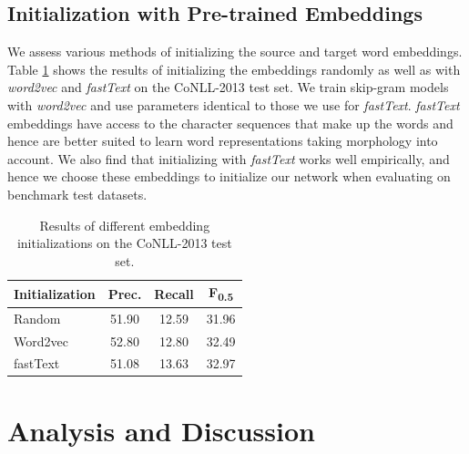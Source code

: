 \documentclass[letterpaper]{article}
\begin{document}
\subsection{Initialization with Pre-trained Embeddings}

\vspace{-3.53mm}
We assess various methods of initializing the source and target word embeddings. Table \ref{tbl:embeddings} shows the results of initializing the embeddings randomly as well as with \textit{word2vec} and \textit{fastText} on the CoNLL-2013 test set. We train skip-gram models with \textit{word2vec} and use parameters identical to those we use for \textit{fastText}.   \textit{fastText} embeddings have access to the character sequences that make up the words and hence are better suited to learn word representations taking morphology into account. We also find that initializing with \textit{fastText} works well empirically, and hence we choose these embeddings to initialize our network when evaluating on benchmark test datasets.

\begin{table}[t]
\centering
\small
\begin{adjustbox}{width=0.52\columnwidth}
\begin{tabular}{|l|c|c|c|}
\hline
Initialization  &	 Prec. & 	Recall & 	F\textsubscript{0.5} 	\\
\hline
Random 			&	51.90	&	12.59	& 31.96		\\
Word2vec 		&	52.80	&	12.80	& 32.49	\\
\hline
fastText 		&	51.08   &   13.63   & 32.97   	\\
\hline
\end{tabular}
\end{adjustbox}
\vspace{-2.89mm}
\caption{Results of different embedding initializations on the CoNLL-2013 test set.}
\label{tbl:embeddings}
\end{table}

\section{Analysis and Discussion}
\end{document}
